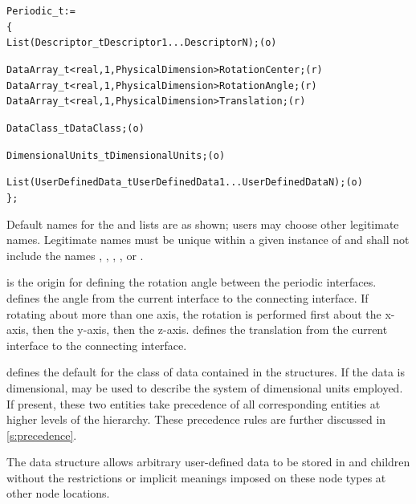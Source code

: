 \begin{alltt}
  Periodic\_t :=
    \{
    List( Descriptor\_t Descriptor1 ... DescriptorN ) ;                      (o)

    DataArray\_t<real, 1, PhysicalDimension> RotationCenter ;                (r)
    DataArray\_t<real, 1, PhysicalDimension> RotationAngle ;                 (r)
    DataArray\_t<real, 1, PhysicalDimension> Translation ;                   (r)

    DataClass\_t DataClass ;                                                 (o)

    DimensionalUnits\_t DimensionalUnits ;                                   (o)

    List( UserDefinedData\_t UserDefinedData1 ... UserDefinedDataN ) ;       (o)
    \} ;
\end{alltt}

\begin{notes}
\item
 Default names for the  and
  lists are as shown; users may choose other
 legitimate names.
 Legitimate names must be unique within a given instance of
  and shall not include the names ,
 , , ,
 or .
\end{notes}

 is the origin for defining the rotation angle
between the periodic interfaces.
 defines the angle from the current interface to
the connecting interface.
If rotating about more than one axis, the rotation is performed first
about the x-axis, then the y-axis, then the z-axis.
 defines the translation from the current interface
to the connecting interface.

 defines the default for the class of data contained in
the  structures.
If the data is dimensional,  may be used to
describe the system of dimensional units employed.
If present, these two entities take precedence of all corresponding
entities at higher levels of the hierarchy.
These precedence rules are further discussed in \autoref{s:precedence}.

The  data structure allows arbitrary
user-defined data to be stored in  and
 children without the restrictions or implicit
meanings imposed on these node types at other node locations.

